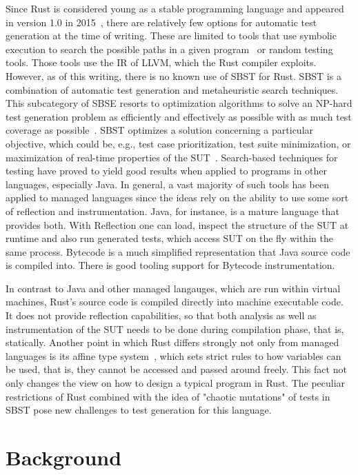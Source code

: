\documentclass{article}
\begin{document}
Since Rust is considered young as a stable programming language and appeared in version 1.0 in 2015~\cite{Rust10}, there are relatively few options for automatic test generation at the time of writing. These are limited to tools that use symbolic execution to search the possible paths in a given program~\cite{cadar2008klee} or random testing tools. Those tools use the \ac{IR} of LLVM, which the Rust compiler exploits. However, as of this writing, there is no known use of \ac{SBST} for Rust. \ac{SBST} is a combination of automatic test generation and metaheuristic search techniques. This subcategory of \ac{SBSE} resorts to optimization algorithms to solve an NP-hard test generation problem as efficiently and effectively as possible with as much test coverage as possible~\cite{Khari2019}. \ac{SBST} optimizes a solution concerning a particular objective, which could be, e.g., test case prioritization, test suite minimization, or maximization of real-time properties of the \ac{SUT}~\cite{Khari2019}. Search-based techniques for testing have proved to yield good results when applied to programs in other languages, especially Java. In general, a vast majority of such tools has been applied to managed languages since the ideas rely on the ability to use some sort of reflection and instrumentation. Java, for instance, is a mature language that provides both. With Reflection one can load, inspect the structure of the \ac{SUT} at runtime and also run generated tests, which access \ac{SUT} on the fly within the same process. Bytecode is a much simplified representation that Java source code is compiled into. There is good tooling support for Bytecode instrumentation.

In contrast to Java and other managed langauges, which are run within virtual machines, Rust's source code is compiled directly into machine executable code. It does not provide reflection capabilities, so that both analysis as well as instrumentation of the \ac{SUT} needs to be done during compilation phase, that is, statically. Another point in which Rust differs strongly not only from managed languages is its affine type system~\cite{Anderson2016}, which sets strict rules to how variables can be used, that is, they cannot be accessed and passed around freely. This fact not only changes the view on how to design a typical program in Rust. The peculiar restrictions of Rust combined with the idea of "chaotic mutations" of tests in SBST pose new challenges to test generation for this language.

\section{Background}
\end{document}
